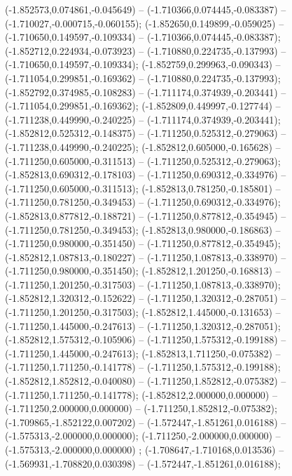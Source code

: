  (-1.852573,0.074861,-0.045649) -- (-1.710366,0.074445,-0.083387) -- (-1.710027,-0.000715,-0.060155);
 (-1.852650,0.149899,-0.059025) -- (-1.710650,0.149597,-0.109334) -- (-1.710366,0.074445,-0.083387);
 (-1.852712,0.224934,-0.073923) -- (-1.710880,0.224735,-0.137993) -- (-1.710650,0.149597,-0.109334);
 (-1.852759,0.299963,-0.090343) -- (-1.711054,0.299851,-0.169362) -- (-1.710880,0.224735,-0.137993);
 (-1.852792,0.374985,-0.108283) -- (-1.711174,0.374939,-0.203441) -- (-1.711054,0.299851,-0.169362);
 (-1.852809,0.449997,-0.127744) -- (-1.711238,0.449990,-0.240225) -- (-1.711174,0.374939,-0.203441);
 (-1.852812,0.525312,-0.148375) -- (-1.711250,0.525312,-0.279063) -- (-1.711238,0.449990,-0.240225);
 (-1.852812,0.605000,-0.165628) -- (-1.711250,0.605000,-0.311513) -- (-1.711250,0.525312,-0.279063);
 (-1.852813,0.690312,-0.178103) -- (-1.711250,0.690312,-0.334976) -- (-1.711250,0.605000,-0.311513);
 (-1.852813,0.781250,-0.185801) -- (-1.711250,0.781250,-0.349453) -- (-1.711250,0.690312,-0.334976);
 (-1.852813,0.877812,-0.188721) -- (-1.711250,0.877812,-0.354945) -- (-1.711250,0.781250,-0.349453);
 (-1.852813,0.980000,-0.186863) -- (-1.711250,0.980000,-0.351450) -- (-1.711250,0.877812,-0.354945);
 (-1.852812,1.087813,-0.180227) -- (-1.711250,1.087813,-0.338970) -- (-1.711250,0.980000,-0.351450);
 (-1.852812,1.201250,-0.168813) -- (-1.711250,1.201250,-0.317503) -- (-1.711250,1.087813,-0.338970);
 (-1.852812,1.320312,-0.152622) -- (-1.711250,1.320312,-0.287051) -- (-1.711250,1.201250,-0.317503);
 (-1.852812,1.445000,-0.131653) -- (-1.711250,1.445000,-0.247613) -- (-1.711250,1.320312,-0.287051);
 (-1.852812,1.575312,-0.105906) -- (-1.711250,1.575312,-0.199188) -- (-1.711250,1.445000,-0.247613);
 (-1.852813,1.711250,-0.075382) -- (-1.711250,1.711250,-0.141778) -- (-1.711250,1.575312,-0.199188);
 (-1.852812,1.852812,-0.040080) -- (-1.711250,1.852812,-0.075382) -- (-1.711250,1.711250,-0.141778);
 (-1.852812,2.000000,0.000000) -- (-1.711250,2.000000,0.000000) -- (-1.711250,1.852812,-0.075382);
 (-1.709865,-1.852122,0.007202) -- (-1.572447,-1.851261,0.016188) -- (-1.575313,-2.000000,0.000000);
 (-1.711250,-2.000000,0.000000) -- (-1.575313,-2.000000,0.000000) ;
 (-1.708647,-1.710168,0.013536) -- (-1.569931,-1.708820,0.030398) -- (-1.572447,-1.851261,0.016188);
